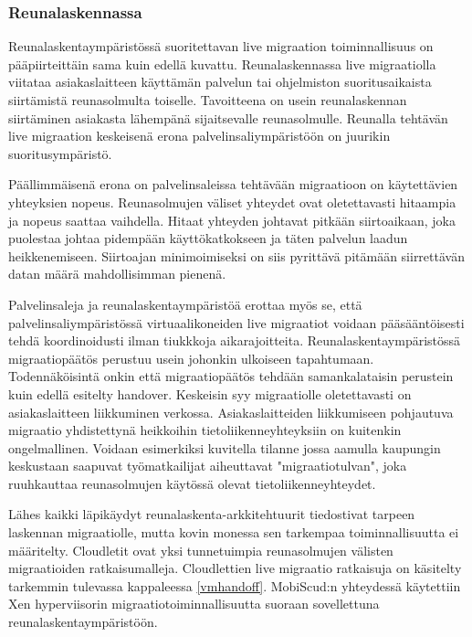 \subsubsection*{Reunalaskennassa}
Reunalaskentaympäristössä suoritettavan live migraation toiminnallisuus on pääpiirteittäin sama kuin edellä kuvattu.
Reunalaskennassa live migraatiolla viitataa asiakaslaitteen käyttämän palvelun tai ohjelmiston suoritusaikaista siirtämistä reunasolmulta toiselle. Tavoitteena on usein reunalaskennan siirtäminen asiakasta lähempänä sijaitsevalle reunasolmulle. Reunalla tehtävän live migraation keskeisenä erona palvelinsaliympäristöön on juurikin suoritusympäristö. 

Päällimmäisenä erona on palvelinsaleissa tehtävään migraatioon on käytettävien yhteyksien nopeus. Reunasolmujen väliset yhteydet ovat oletettavasti hitaampia ja nopeus saattaa vaihdella\cite{ha2017you}.
Hitaat yhteyden johtavat pitkään siirtoaikaan, joka puolestaa johtaa pidempään käyttökatkokseen ja täten palvelun laadun heikkenemiseen.
Siirtoajan minimoimiseksi on siis pyrittävä pitämään siirrettävän datan määrä mahdollisimman pienenä.



Palvelinsaleja ja reunalaskentaympäristöä erottaa myös se, että palvelinsaliympäristössä virtuaalikoneiden live migraatiot voidaan pääsääntöisesti tehdä koordinoidusti ilman tiukkkoja aikarajoitteita. 
Reunalaskentaympäristössä migraatiopäätös perustuu usein johonkin ulkoiseen tapahtumaan. Todennäköisintä onkin että migraatiopäätös tehdään samankalataisin perustein kuin edellä esitelty handover. Keskeisin syy migraatiolle oletettavasti on asiakaslaitteen liikkuminen verkossa. Asiakaslaitteiden liikkumiseen pohjautuva migraatio yhdistettynä heikkoihin tietoliikenneyhteyksiin on kuitenkin ongelmallinen. Voidaan esimerkiksi kuvitella tilanne jossa aamulla kaupungin keskustaan saapuvat työmatkailijat aiheuttavat "migraatiotulvan", joka ruuhkauttaa reunasolmujen käytössä olevat tietoliikenneyhteydet.


Lähes kaikki läpikäydyt reunalaskenta-arkkitehtuurit tiedostivat tarpeen laskennan migraatiolle, mutta kovin monessa sen tarkempaa toiminnallisuutta ei määritelty.
Cloudletit ovat yksi tunnetuimpia reunasolmujen välisten migraatioiden ratkaisumalleja. Cloudlettien live migraatio ratkaisuja on käsitelty tarkemmin tulevassa kappaleessa \ref{vmhandoff}. 
MobiScud:n yhteydessä käytettiin Xen hyperviisorin migraatiotoiminnallisuutta suoraan sovellettuna reunalaskentaympäristöön\cite{wang2015mobiscud}.